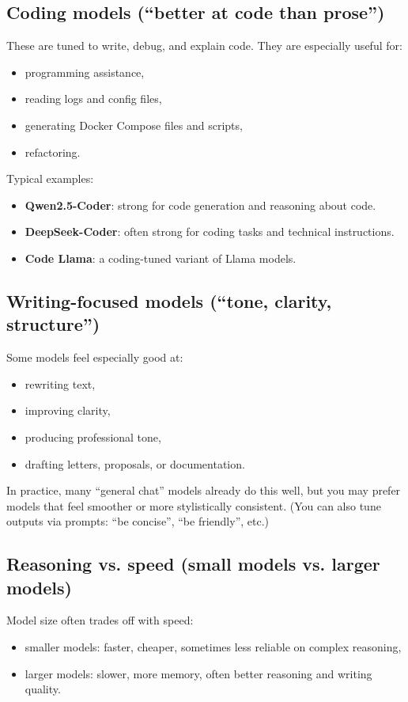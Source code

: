\subsection{Coding models (``better at code than prose'')}
These are tuned to write, debug, and explain code.
They are especially useful for:
\begin{itemize}[leftmargin=*]
  \item programming assistance,
  \item reading logs and config files,
  \item generating Docker Compose files and scripts,
  \item refactoring.
\end{itemize}

Typical examples:
\begin{itemize}[leftmargin=*]
  \item \textbf{Qwen2.5-Coder}: strong for code generation and reasoning about code.
  \item \textbf{DeepSeek-Coder}: often strong for coding tasks and technical instructions.
  \item \textbf{Code Llama}: a coding-tuned variant of Llama models.
\end{itemize}


\subsection{Writing-focused models (``tone, clarity, structure'')}
Some models feel especially good at:
\begin{itemize}[leftmargin=*]
  \item rewriting text,
  \item improving clarity,
  \item producing professional tone,
  \item drafting letters, proposals, or documentation.
\end{itemize}

In practice, many ``general chat'' models already do this well, but you may prefer models that feel smoother or more stylistically consistent.
(You can also tune outputs via prompts: ``be concise'', ``be friendly'', etc.)

\subsection{Reasoning vs. speed (small models vs. larger models)}
Model size often trades off with speed:
\begin{itemize}[leftmargin=*]
  \item smaller models: faster, cheaper, sometimes less reliable on complex reasoning,
  \item larger models: slower, more memory, often better reasoning and writing quality.
\end{itemize}

